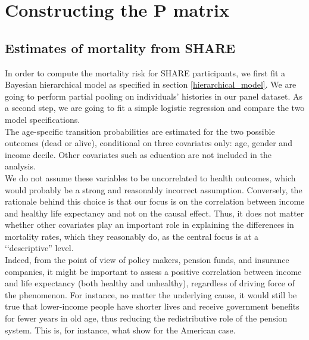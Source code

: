 



\section{Constructing the P matrix}




\subsection{Estimates of mortality from SHARE}

In order to compute the mortality risk for SHARE participants, we first fit a Bayesian hierarchical model as specified in section \ref{hierarchical_model}. We are going to perform partial pooling on individuals' histories in our panel dataset. As a second step, we are going to fit a simple logistic regression and compare the two model specifications.\\



The age-specific transition probabilities are estimated for the two possible outcomes (dead or alive), conditional on three covariates only: age, gender and income decile.
Other covariates such as education are not included in the analysis. \\
We do not assume these variables to be uncorrelated to health outcomes, which would probably be a strong and reasonably incorrect assumption. Conversely, the rationale behind this choice is that our focus is on the correlation between income and healthy life expectancy and not on the causal effect. Thus, it does not matter whether other covariates play an important role in explaining the differences in mortality rates, which they reasonably do, as the central focus is at a \lq\lq descriptive'' level.\\


Indeed, from the point of view of policy makers, pension funds, and insurance companies, it might be important to assess a positive correlation between income and life expectancy (both healthy and unhealthy), regardless of driving force of the phenomenon. For instance, no matter the underlying cause, it would still be true that lower-income people have shorter lives and receive government benefits for fewer years in old age, thus reducing the  redistributive role of the pension system. This is, for instance, what \cite{Auerbach2017} show for the American case.\\

